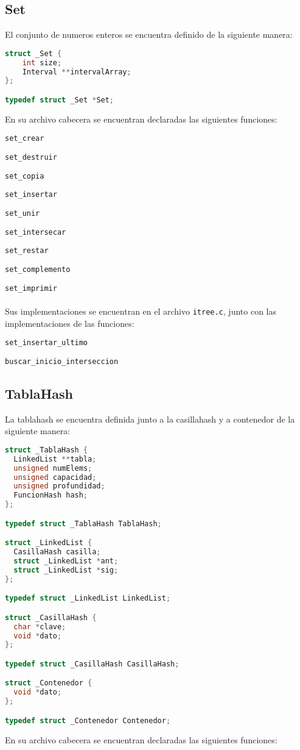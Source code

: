\documentclass[]{article}
\begin{document}
\subsection{Set}
El conjunto de numeros enteros se encuentra definido de la siguiente manera:

\begin{lstlisting}[language=C]
struct _Set {
    int size;
    Interval **intervalArray;
};

typedef struct _Set *Set;

\end{lstlisting}
En su archivo cabecera se encuentran declaradas las siguientes funciones:

\verb|set_crear|

\verb|set_destruir|

\verb|set_copia|

\verb|set_insertar|

\verb|set_unir|

\verb|set_intersecar|

\verb|set_restar|

\verb|set_complemento|

\verb|set_imprimir|\\\\
Sus implementaciones se encuentran en el archivo \verb|itree.c|, junto con las implementaciones de las funciones:

\verb|set_insertar_ultimo|

\verb|buscar_inicio_interseccion|
\subsection{TablaHash}
La tablahash se encuentra definida junto a la casillahash y a contenedor de la siguiente manera:

\begin{lstlisting}[language=C]
struct _TablaHash {
  LinkedList **tabla;
  unsigned numElems;
  unsigned capacidad;
  unsigned profundidad;
  FuncionHash hash;
};

typedef struct _TablaHash TablaHash;

struct _LinkedList {
  CasillaHash casilla;
  struct _LinkedList *ant;
  struct _LinkedList *sig;
};

typedef struct _LinkedList LinkedList;

struct _CasillaHash {
  char *clave;
  void *dato;
};

typedef struct _CasillaHash CasillaHash;

struct _Contenedor {
  void *dato;
};

typedef struct _Contenedor Contenedor;

\end{lstlisting}
En su archivo cabecera se encuentran declaradas las siguientes funciones:
\end{document}
